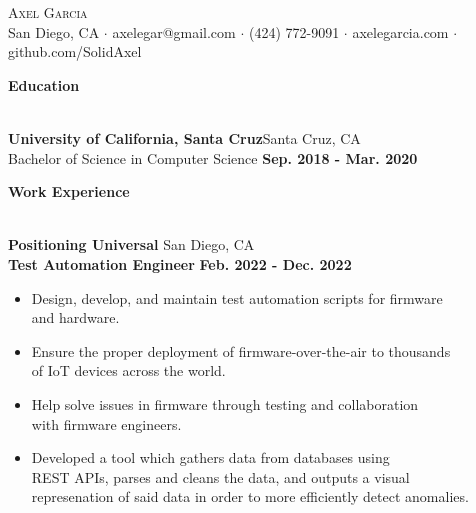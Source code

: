 \documentclass[a4paper]{article}
\newcommand{\lineunder} {
    \vspace*{-8pt} \\
    \hspace*{-18pt} \hrulefill \\
}
\newcommand{\header} [1] {
    {\hspace*{-18pt}\vspace*{6pt}\LARGE \textbf{#1}}
    \vspace*{-6pt} \lineunder
}
\begin{document}
\vspace*{-40pt}

    

\vspace*{-10pt}
\begin{center}
	{\Huge \scshape {Axel Garcia}}\\[2mm]
	San Diego, CA $\cdot$ axelegar@gmail.com $\cdot$ (424) 772-9091 $\cdot$ axelegarcia.com $\cdot$ github.com/SolidAxel\\
\end{center}

\header{Education}
\vspace{1mm}

\textbf{University of California, Santa Cruz}\hfill Santa Cruz, CA\\
\quad Bachelor of Science in Computer Science \hfill \textbf{Sep. 2018 - Mar. 2020}\\
\vspace{2mm}

\header{Work Experience}
\vspace{1mm}

\textbf{Positioning Universal} \hfill San Diego, CA\\
\hspace{4mm} \textbf{Test Automation Engineer} \hfill \textbf{Feb. 2022 - Dec. 2022}\\
\vspace{-2mm}
\begin{itemize} \itemsep -2pt
	\item Design, develop, and maintain test automation scripts for firmware\\ and hardware.
	\item Ensure the proper deployment of firmware-over-the-air to thousands \\of IoT devices across the world.
	\item Help solve issues in firmware through testing and collaboration\\ with firmware engineers.
	\item Developed a tool which gathers data from databases using\\ REST APIs, parses and cleans the data, and outputs a visual\\ represenation of said data in order to more efficiently detect anomalies.
\end{itemize}
\end{document}
